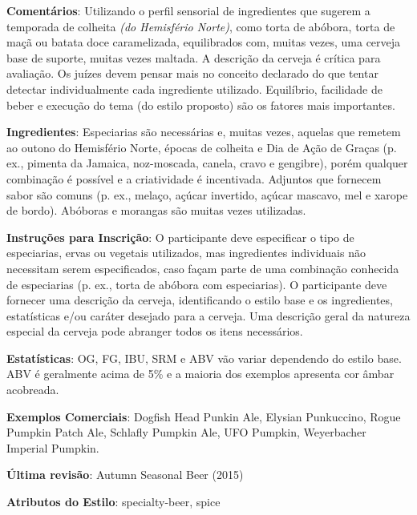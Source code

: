 \textbf{Comentários}: Utilizando o perfil sensorial de ingredientes que sugerem a temporada de colheita \textit{(do Hemisfério Norte)}, como torta de abóbora, torta de maçã ou batata doce caramelizada, equilibrados com, muitas vezes, uma cerveja base de suporte, muitas vezes maltada. A descrição da cerveja é crítica para avaliação. Os juízes devem pensar mais no conceito declarado do que tentar detectar individualmente cada ingrediente utilizado. Equilíbrio, facilidade de beber e execução do tema (do estilo proposto) são os fatores mais importantes.

\textbf{Ingredientes}: Especiarias são necessárias e, muitas vezes, aquelas que remetem ao outono do Hemisfério Norte, épocas de colheita e Dia de Ação de Graças (p. ex., pimenta da Jamaica, noz-moscada, canela, cravo e gengibre), porém qualquer combinação é possível e a criatividade é incentivada. Adjuntos que fornecem sabor são comuns (p. ex., melaço, açúcar invertido, açúcar mascavo, mel e xarope de bordo). Abóboras e morangas são muitas vezes utilizadas.

\textbf{Instruções para Inscrição}: O participante deve especificar o tipo de especiarias, ervas ou vegetais utilizados, mas ingredientes individuais não necessitam serem especificados, caso façam parte de uma combinação conhecida de especiarias (p. ex., torta de abóbora com especiarias). O participante deve fornecer uma descrição da cerveja, identificando o estilo base e os ingredientes, estatísticas e/ou caráter desejado para a cerveja. Uma descrição geral da natureza especial da cerveja pode abranger todos os itens necessários.

\textbf{Estatísticas}: OG, FG, IBU, SRM e ABV vão variar dependendo do estilo base. ABV é geralmente acima de 5\% e a maioria dos exemplos apresenta cor âmbar acobreada.

\textbf{Exemplos Comerciais}: Dogfish Head Punkin Ale, Elysian Punkuccino, Rogue Pumpkin Patch Ale, Schlafly Pumpkin Ale, UFO Pumpkin, Weyerbacher Imperial Pumpkin.

\textbf{Última revisão}: Autumn Seasonal Beer (2015)

\textbf{Atributos do Estilo}: specialty-beer, spice

